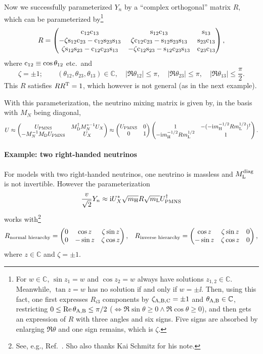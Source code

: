 \documentclass[CheatSheet]{subfiles}
\newcommand\MD[1][]{M_{\mathrm{D}#1}}
\newcommand\MN[1][]{M_{N#1}}
\begin{document}
Now we successfully parameterized $Y_n$ by a ``complex orthogonal'' matrix $R$, which can be parameterized by\footnote{For $w\in\mathbb C$, $\sin z_1=w$ and $\cos z_2=w$ always have solutions $z_{1,2}\in\mathbb C$. Meanwhile, $\tan z=w$ has no solution if and only if $w=\pm \ii$. Then, using this fact, one first expresses $R_{i3}$ components by $\zeta_{\mathrm{A,B,C}}=\pm1$ and $\theta_{\mathrm{A,B}}\in\mathbb C$, restricting $0\le\mathop{\mathrm{Re}}\theta_{\mathrm{A,B}}\le\pi/2$ ($\Leftrightarrow\Re{\sin{\theta}}\ge0\land\Re\cos\theta\ge0$), and then gets an expression of $R$ with three angles and six signs. Five signs are absorbed by enlarging $\Re\theta$ and one sign remains, which is $\zeta$.}
\begin{equation}
 R=\begin{pmatrix}
 \mathrm{c}_{12} \mathrm{c}_{13} & \mathrm{s}_{12} \mathrm{c}_{13} & \mathrm{s}_{13} \\
 -\zeta \mathrm{s}_{12} \mathrm{c}_{23}-\mathrm{c}_{12} \mathrm{s}_{23} \mathrm{s}_{13} & \zeta \mathrm{c}_{12} \mathrm{c}_{23} -\mathrm{s}_{12} \mathrm{s}_{23} \mathrm{s}_{13} & \mathrm{s}_{23} \mathrm{c}_{13} \\
  \zeta \mathrm{s}_{12} \mathrm{s}_{23}-\mathrm{c}_{12} \mathrm{c}_{23} \mathrm{s}_{13} & -\zeta\mathrm{c}_{12} \mathrm{s}_{23} -\mathrm{s}_{12} \mathrm{c}_{23} \mathrm{s}_{13} & \mathrm{c}_{23} \mathrm{c}_{13}
\end{pmatrix},
\end{equation}
where $\mathrm{c}_{12}\equiv \cos{\theta_{12}}$ etc.\ and
\begin{equation}
 \zeta=\pm1; \qquad
(\theta_{12},\theta_{23},\theta_{13})\in\mathbb C,\quad
|\Re\theta_{12}|\le\pi, \quad |\Re\theta_{23}|\le\pi,  \quad |\Re\theta_{13}|\le\frac{\pi}{2}.
\end{equation}
This $R$ satisfies $RR^{\mathrm{T}}=1$, which however is not general (as in the next example).

With this parameterization, the neutrino mixing matrix is given by, in the basis with $\MN$ being diagonal,
\begin{equation}
 U \approx \pmat{
  U\w{PMNS}
  &  \MD^\dagger \MN^{*-1} U_X
  \\ -\MN^{-1} \MD U\w{PMNS}
  &  U_X
}
\approx\pmat{U\w{PMNS}&0\\0&1}\pmat{
  1
  &  -(-\ii{m\w H^{-1/2}}R{m\w L^{1/2}})^\dagger
  \\ -\ii m\w H^{-1/2}R{m\w L^{1/2}}
  &  1
}.
\end{equation}

\paragraph{Example: two right-handed neutrinos}
For models with two right-handed neutrinos, one neutrino is massless and $M_{\mathrm{L}}^{\text{diag}}$ is not invertible. However the parameterization
\begin{equation}
 \frac{v}{\sqrt2}Y_n
  \approx \mathrm{i} U_X^*\sqrt{m_{\mathrm{H}}}R\sqrt{m_{\mathrm{L}}}U_{\mathrm{PMNS}}^\dagger
\end{equation}
works with\footnote{See, e.g., Ref.~\cite{Brdar:2019iem}. Sho also thanks Kai Schmitz for his note.}
\begin{align}
 R_{\text{normal hierarchy}}&=\begin{pmatrix}0 & \cos z & \zeta\sin z \\ 0 & -\sin z & \zeta \cos z\end{pmatrix},&
 R_{\text{inverse hierarchy}}=\begin{pmatrix}\cos z & \zeta\sin z &0 \\ -\sin z & \zeta \cos z & 0\end{pmatrix},
\end{align}
where $z\in\mathbb C$ and $\zeta=\pm1$.
\end{document}
